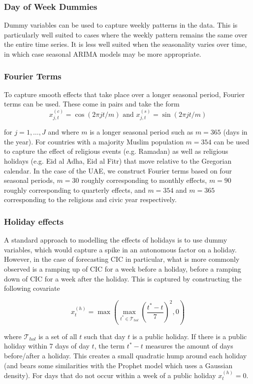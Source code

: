 \documentclass{article}
\begin{document}
\subsubsection{Day of Week Dummies}

Dummy variables can be used to capture weekly patterns in the data. This is particularly well suited to cases where the weekly pattern remains the same over the entire time series. It is less well suited when the seasonality varies over time, in which case seasonal ARIMA models may be more appropriate.

\subsubsection{Fourier Terms}

To capture smooth effects that take place over a longer seasonal period, Fourier terms can be used. These come in pairs and take the form
\[
x_{j,t}^{(c)}=\cos(2\pi jt/m)\textrm{  and  } x_{j,t}^{(s)}=\sin(2\pi jt/m)
\]

for $j=1,\dots,J$ and where $m$ is a longer seasonal period such as $m=365$ (days in the year). For countries with a majority Muslim population $m=354$ can be used to capture the effect of religious events (e.g. Ramadan) as well as religious holidays (e.g. Eid al Adha, Eid al Fitr) that move relative to the Gregorian calendar. In the case of the UAE, we construct Fourier terms based on four seasonal periods, $m=30$ roughly corresponding to monthly effects, $m=90$ roughly corresponding to quarterly effects, and $m=354$ and $m=365$ corresponding to the religious and civic year respectively.

\subsubsection{Holiday effects}

A standard approach to modelling the effects of holidays is to use dummy variables, which would capture a spike in an autonomous factor on a holiday. However, in the case of forecasting CIC in particular, what is more commonly observed is a ramping up of CIC for a week before a holiday, before a ramping down of CIC for a week after the holiday. This is captured by constructing the following covariate

\[
x_t^{(h)}=\max\left(\underset{t^*\in\mathcal{T}_{hol}}{\max}\left(\frac{t^*-t}{7}\right)^2,0\right)
\]

where $\mathcal{T}_{hol}$ is a set of all $t$ such that day $t$ is a public holiday. If there is a public holiday within 7 days of day $t$, the term $t^*-t$ measures the amount of days before/after a holiday. This creates a small quadratic hump around each holiday (and bears some similarities with the Prophet model \citep{TayLet2018} which uses a Gaussian density). For days that do not occur within a week of a public holiday $x_t^{(h)}=0$.
\end{document}
